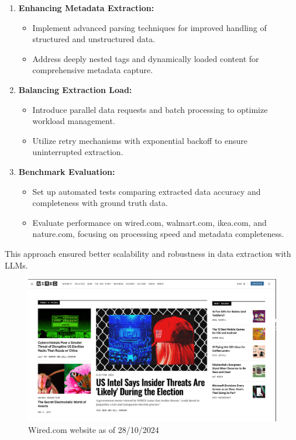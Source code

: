 \begin{enumerate}
    \item \textbf{Enhancing Metadata Extraction:}
    \begin{itemize}
        \item Implement advanced parsing techniques for improved handling of structured and unstructured data.
        \item Address deeply nested tags and dynamically loaded content for comprehensive metadata capture.
    \end{itemize}
    
    \item \textbf{Balancing Extraction Load:}
    \begin{itemize}
        \item Introduce parallel data requests and batch processing to optimize workload management.
        \item Utilize retry mechanisms with exponential backoff to ensure uninterrupted extraction.
    \end{itemize}
    
    \item \textbf{Benchmark Evaluation:}
    \begin{itemize}
        \item Set up automated tests comparing extracted data accuracy and completeness with ground truth data.
        \item Evaluate performance on wired.com, walmart.com, ikea.com, and nature.com, focusing on processing speed and metadata completeness.
    \end{itemize}
\end{enumerate}

This approach ensured better scalability and robustness in data extraction with LLMs.

\begin{figure}[h!]
    \centering
    \includegraphics[width=0.95\linewidth]{Assets/wired.png}
    \caption{Wired.com website as of 28/10/2024}
    \label{fig:enter-label}
\end{figure}

